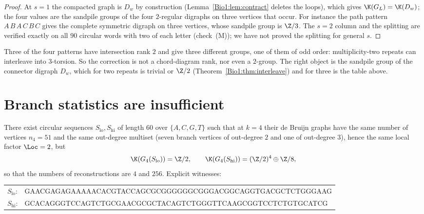 \begin{proof}
At $s=1$ the compacted graph is $D_w$ by construction (Lemma~\ref{Bio1:lem:contract} deletes
the loops), which gives $\K(G_L)=\K(D_w)$; the four values are the sandpile groups of the
four $2$-regular digraphs on three vertices that occur. For instance the path pattern
$A\,B\,A\,C\,B\,C$ gives the complete symmetric digraph on three vertices, whose sandpile
group is $\Z/3$. The $s=2$ column and the splitting are verified exactly on all $90$
circular words with two of each letter (check~(M)); we have not proved the splitting for
general $s$.
\end{proof}

\begin{remark}\label{Bio1:rem:notrank}
Three of the four patterns have intersection rank $2$ and give three different groups,
one of them of odd order: multiplicity-two repeats can interleave into $3$-torsion. So the
correction is not a chord-diagram rank, nor even a $2$-group. The right object is the
sandpile group of the connector digraph $D_w$, which for two repeats is trivial or $\Z/2$
(Theorem~\ref{Bio1:thm:interleave}) and for three is the table above.
\end{remark}

\section{Branch statistics are insufficient}\label{Bio1:sec:notdeg}

\begin{theorem}\label{Bio1:thm:notdeg}
There exist circular sequences $S_{\mathrm{lo}},S_{\mathrm{hi}}$ of length $60$ over
$\{A,C,G,T\}$ such that at $k=4$ their de Bruijn graphs have the same number of vertices
$n_4=51$ and the same out-degree multiset (seven branch vertices of out-degree $2$ and one
of out-degree $3$), hence the same local factor $\Loc=2$, but
\[
\K(G_4(S_{\mathrm{lo}}))=\Z/2,\qquad
\K(G_4(S_{\mathrm{hi}}))=(\Z/2)^{4}\oplus\Z/8 ,
\]
so that the numbers of reconstructions are $4$ and $256$. Explicit witnesses:
\begin{center}\ttfamily\small
\begin{tabular}{ll}
$S_{\mathrm{lo}}$: & GAACGAGAGAAAAACACGTACCAGCGCGGGGGGCGGGACGGCAGGTGACGCTCTGGGAAG\\
$S_{\mathrm{hi}}$: & GCACAGGGTCCAGTCTGCGAACGCGCTACAGTCTGGGTTCAAGCGGTCCTCTGTGCATCG\\
\end{tabular}
\end{center}
\end{theorem}


